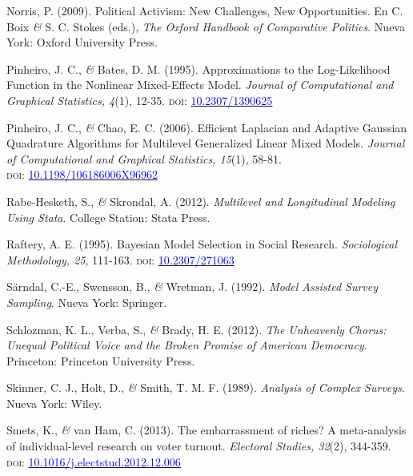 \documentclass[a4paper]{tufte-handout}
\begin{document}
{{{{{{{{{{{{{\begin{list}{}
\item{\small Norris, P. (2009). Political Activism: New Challenges, New Opportunities. En C. Boix {\itshape \&} S. C. Stokes (eds.), {\itshape The Oxford Handbook of Comparative Politics}. Nueva York: Oxford University Press.}

\item{\small Pinheiro, J. C., {\itshape \&} Bates, D. M. (1995). Approximations to the Log-Likelihood Function in the Nonlinear Mixed-Effects Model. {\itshape Journal of Computational and Graphical Statistics, 4}(1), 12-35. {\scshape doi:} \href{http://doi.org/10.2307/1390625}{\textcolor{blue}{10.2307/1390625}}}

\item{\small Pinheiro, J. C., {\itshape \&} Chao, E. C. (2006). Efficient Laplacian and Adaptive Gaussian Quadrature Algorithms for Multilevel Generalized Linear Mixed Models. {\itshape Journal of Computational and Graphical Statistics, 15}(1), 58-81. \\ {\scshape doi:} \href{https://doi.org/10.1198/106186006X96962}{\textcolor{blue}{10.1198/106186006X96962}}}

\item{\small Rabe-Hesketh, S., {\itshape \&} Skrondal, A. (2012). {\itshape Multilevel and Longitudinal Modeling Using Stata}. College Station: Stata Press.}

\item{\small Raftery, A. E. (1995). Bayesian Model Selection in Social Research. {\itshape Sociological Methodology, 25}, 111-163. {\scshape doi:} \href{http://doi.org/10.2307/271063}{\textcolor{blue}{10.2307/271063}}}

\item{\small Särndal, C.-E., Swensson, B., {\itshape \&} Wretman, J. (1992). {\itshape Model Assisted Survey Sampling}. Nueva York: Springer.}

\item{\small Schlozman, K. L., Verba, S., {\itshape \&} Brady, H. E. (2012). {\itshape The Unheavenly Chorus: Unequal Political Voice and the Broken Promise of American Democracy}. Princeton: Princeton University Press.}

\item{\small Skinner, C. J., Holt, D., {\itshape \&} Smith, T. M. F. (1989). {\itshape Analysis of Complex Surveys}. Nueva York: Wiley.}

\item{\small Smets, K., {\itshape \&} van Ham, C. (2013). The embarrassment of riches? A meta-analysis of individual-level research on voter turnout. {\itshape Electoral Studies, 32}(2), 344-359. {\scshape doi:} \href{https://doi.org/10.1016/j.electstud.2012.12.006}{\textcolor{blue}{10.1016/j.electstud.2012.12.006}}}


\end{list}}}}}}}}}}}}}}
\end{document}
